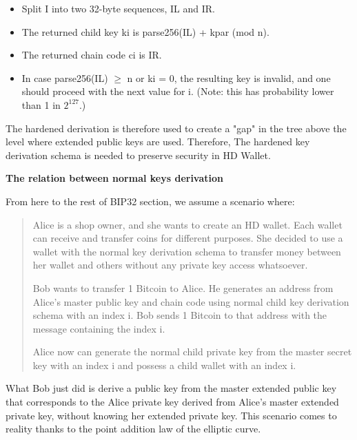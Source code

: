 \begin{adjustwidth}{0.5cm}{}
\begin{itemize}
\begin{itemize}
          \end{itemize}
          \bigskip

    \item Split I into two 32-byte sequences, IL and IR.
        \bigskip

    \item The returned child key ki is parse256(IL) + kpar (mod n).
    \bigskip

    \item The returned chain code ci is IR.
    \bigskip

    \item In case parse256(IL) $\geq$ n or ki = 0, the resulting key is invalid, and one should proceed with the next value for i. (Note: this has probability lower than 1 in $2^{127}$.)

\end{itemize}

The hardened derivation is therefore used to create a "gap" in the tree above the level where extended public keys are used. Therefore, The hardened key derivation schema is needed to preserve security in HD Wallet.
\end{adjustwidth}

\bigskip
{\textbf{The relation between normal keys derivation}}

From here to the rest of BIP32 section, we assume a scenario where:

\begin{quote}
    Alice is a shop owner, and she wants to create an HD wallet. Each wallet can receive and transfer coins for different purposes. She decided to use a wallet with the normal key derivation schema to transfer money between her wallet and others without any private key access whatsoever.

    Bob wants to transfer 1 Bitcoin to Alice. He generates an address from Alice's master public key and chain code using normal child key derivation schema with an index i. Bob sends 1 Bitcoin to that address with the message containing the index i.
    
    Alice now can generate the normal child private key from the master secret key with an index i and possess a child wallet with an index i.

\end{quote}

What Bob just did is derive a public key from the master extended public key that corresponds to the Alice private key derived from Alice’s master extended private key, without knowing her extended private key. This scenario comes to reality thanks to the point addition law of the elliptic curve. 

